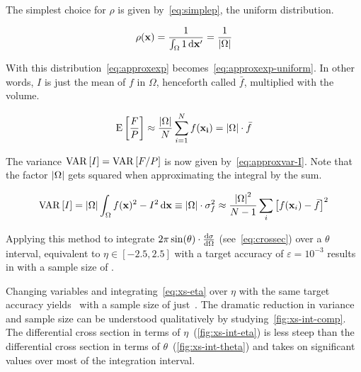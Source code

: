 The simplest choice for \(\rho\) is given
by~\eqref{eq:simplep}, the uniform distribution.

\begin{equation}
  \label{eq:simplep}
  \rho(\vb{x}) = \frac{1}{\int_{\Omega}1\dd{\vb{x'}}} =
  \frac{1}{\abs{\Omega}}
\end{equation}

With this distribution~\eqref{eq:approxexp}
becomes~\eqref{eq:approxexp-uniform}. In other words, \(I\) is just
the mean of \(f\) in \(\Omega\), henceforth
called \(\bar{f}\), multiplied with the volume.

\begin{equation}
  \label{eq:approxexp-uniform}
  \operatorname{E}\qty[\frac{F}{P}] \approx
  \frac{\abs{\Omega}}{N}\sum_{i=1}^N f(\vb{x_i}) = \abs{\Omega}\cdot\bar{f}
\end{equation}

The variance \(\operatorname{VAR}\qty[I]=\operatorname{VAR}\qty[F/P]\) is now given
by~\ref{eq:approxvar-I}. Note that the factor \(\abs{\Omega}\) gets
squared when approximating the integral by the sum.

\begin{equation}
  \label{eq:approxvar-I}
  \operatorname{VAR}\qty[I] = \abs{\Omega}\int_\Omega f(\vb{x})^2 -
  I^2 \dd{\vb{x}} \equiv \abs{\Omega}\cdot\sigma_f^2 \approx
  \frac{\abs{\Omega}^2}{N-1}\sum_{i}\qty[f(\vb{x}_i) - \bar{f}]^2
\end{equation}

Applying this method to integrate
\(2\pi\sin(\theta)\cdot\dv{\sigma}{\Omega}\) (see~\eqref{eq:crossec})
over a \(\theta\) interval, equivalent to \(\eta\in [-2.5, 2.5]\) with
a target accuracy of \(\varepsilon=10^{-3}\) results in
 with a sample size of
.

Changing variables and integrating~\eqref{eq:xs-eta} over \(\eta\)
with the same target accuracy yields~ with
a sample size of just~. The dramatic
reduction in variance and sample size can be understood qualitatively
by studying~\ref{fig:xs-int-comp}. The differential cross section in
terms of \(\eta\)~(\ref{fig:xs-int-eta}) is less steep than the
differential cross section in terms of
\(\theta\)~(\ref{fig:xs-int-theta}) and takes on significant values
over most of the integration interval.

